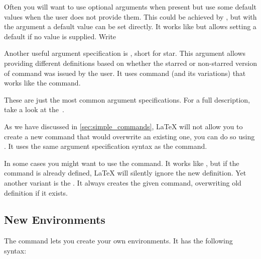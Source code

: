 Often you will want to use optional arguments when present but use some default
values when the user does not provide them. This could be achieved by
, but with the  argument a default value can be set directly.
It works like  but allows setting a default
if no value is supplied. Write


Another useful argument specification is , short for star. This
argument allows providing different definitions based on whether the
starred or non-starred version of command was issued by the user. It uses
 command (and its variations)
that works like the  command.

\begin{chktexignore}
\end{chktexignore}

These are just the most common argument specifications. For a full description,
take a look at the~\cite{usrguide3}.

As we have discussed in \autoref{sec:simple_commands}, \LaTeX{} will not allow
you to create a new command that would overwrite an existing one, you can do so
using . It uses the same argument specification
syntax as the  command.

In some cases you might want to use the  command.
It works like , but if the command is already defined,
\LaTeX{} will silently ignore the new definition. Yet another variant is the
. It always creates the given command, overwriting
old definition if it exists.

\subsection{New Environments}
The  command lets you create your own environments. It has the
following syntax:

